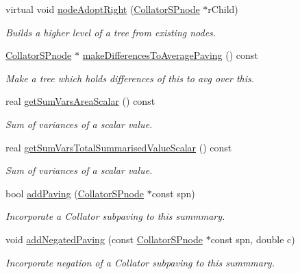 \begin{DoxyCompactItemize}
virtual void \hyperlink{classsubpavings_1_1CollatorSPnode_a324588afd881d4e695f42f4a286b33a7}{node\-Adopt\-Right} (\hyperlink{classsubpavings_1_1CollatorSPnode}{\-Collator\-S\-Pnode} $\ast$r\-Child)
\begin{DoxyCompactList}\small\item\em \-Builds a higher level of a tree from existing nodes. \end{DoxyCompactList}\item 
\hyperlink{classsubpavings_1_1CollatorSPnode}{\-Collator\-S\-Pnode} $\ast$ \hyperlink{classsubpavings_1_1CollatorSPnode_ac1d9ea49286eb953b7bc71f89c15f8ec}{make\-Differences\-To\-Average\-Paving} () const 
\begin{DoxyCompactList}\small\item\em \-Make a tree which holds differences of this to avg over this. \end{DoxyCompactList}\item 
real \hyperlink{classsubpavings_1_1CollatorSPnode_a700f585b2b61663330b999f459045822}{get\-Sum\-Vars\-Area\-Scalar} () const 
\begin{DoxyCompactList}\small\item\em \-Sum of variances of a scalar value. \end{DoxyCompactList}\item 
real \hyperlink{classsubpavings_1_1CollatorSPnode_a4c623e6456d3ced424aebba699c33fd9}{get\-Sum\-Vars\-Total\-Summarised\-Value\-Scalar} () const 
\begin{DoxyCompactList}\small\item\em \-Sum of variances of a scalar value. \end{DoxyCompactList}\item 
bool \hyperlink{classsubpavings_1_1CollatorSPnode_ab32959b197c529211921f3dab4e28177}{add\-Paving} (\hyperlink{classsubpavings_1_1CollatorSPnode}{\-Collator\-S\-Pnode} $\ast$const spn)
\begin{DoxyCompactList}\small\item\em \-Incorporate a \-Collator subpaving to this summmary. \end{DoxyCompactList}\item 
void \hyperlink{classsubpavings_1_1CollatorSPnode_a48244aa234b59b624ec681eaf966cfe4}{add\-Negated\-Paving} (const \hyperlink{classsubpavings_1_1CollatorSPnode}{\-Collator\-S\-Pnode} $\ast$const spn, double c)
\begin{DoxyCompactList}\small\item\em \-Incorporate negation of a \-Collator subpaving to this summmary. \end{DoxyCompactList}\item 

\end{DoxyCompactItemize}
